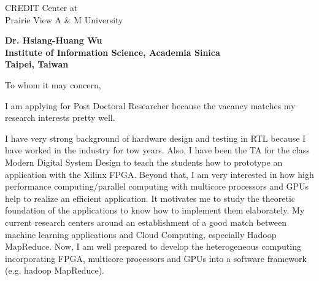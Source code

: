 \documentclass[12pt]{letter} %
\newcounter{comment}
\begin{document}

\begin{letter}{
CREDIT Center at\\
Prairie View A \& M University
} 


\begin{center}
\large\bf Dr. Hsiang-Huang Wu\\ %
Institute of Information Science, Academia Sinica \\ 
Taipei, Taiwan %
\end{center} 
\vfill

\signature{Hsiang-Huang Wu} %


\opening{To whom it may concern,} 

I am applying for Post Doctoral Researcher because the vacancy matches
my research interests pretty well.

I have very strong background of hardware design and testing in RTL because I have worked in the
industry for tow years.  Also, I have been the TA for the class Modern Digital System Design
to teach the students how to prototype an application with the Xilinx FPGA.
Beyond that, I am very interested in how high performance computing/parallel computing with 
multicore processors and GPUs help to realize an efficient application.  It motivates me to study
the theoretic foundation of the applications to know how to implement them elaborately.
My current research centers around an establishment of a good match between machine learning 
applications and Cloud Computing, especially Hadoop MapReduce.  Now, I am well prepared to
develop the heterogeneous computing incorporating FPGA, multicore processors and GPUs into a
software framework (e.g. hadoop MapReduce).


\end{letter}
\end{document}
